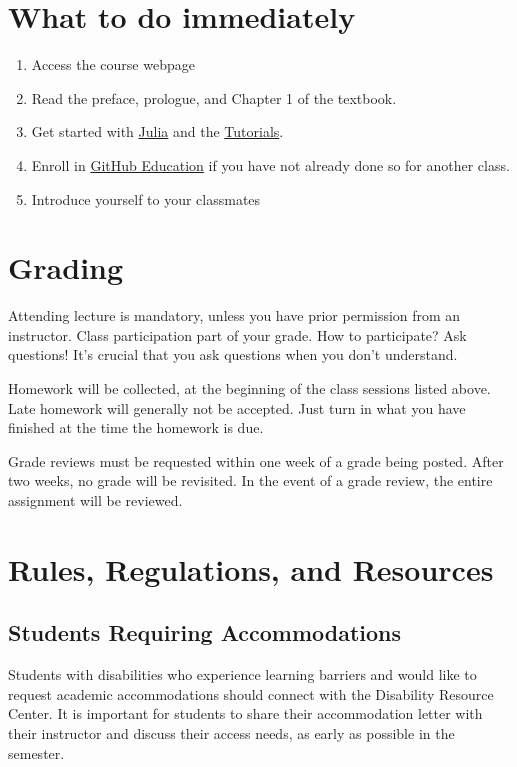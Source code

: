 \documentclass[11pt, article, oneside]{memoir}
\begin{document}
\chapter{What to do immediately}

\begin{enumerate}
\item Access the course webpage
\item Read the preface, prologue, and Chapter 1 of the textbook.
\item Get started with \href{https://julialang.org/}{Julia} and the \href{https://julialang.org/learning/}{Tutorials}.
\item Enroll in \href{https://education.github.com}{GitHub Education} if you have not already done so for another class.
\item Introduce yourself to your classmates
\end{enumerate}

\chapter{Grading}

Attending lecture is mandatory, unless you have prior permission from an instructor. Class participation part of your grade. How to participate? Ask questions! It's crucial that you ask questions when you don't understand.

Homework will be collected, at the beginning of the class sessions listed above. Late homework will generally not be accepted. Just turn in what you have finished at the time the homework is due.

Grade reviews must be requested within one week of a grade being posted. After two weeks, no grade will be revisited. In the event of a grade review, the entire assignment will be reviewed.

\chapter{Rules, Regulations, and Resources}

\section{Students Requiring Accommodations}
Students with disabilities who experience learning barriers and would like to request academic accommodations should connect with the Disability Resource Center. It is important for students to share their accommodation letter with their instructor and discuss their access needs, as early as possible in the semester.
\end{document}
